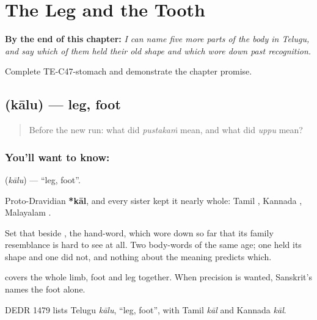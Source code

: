 
\chapter{The Leg and the Tooth}
\label{ch:te-body-more}

\begin{chapteropening}
\textbf{By the end of this chapter:} \emph{I can name five more parts of the body in Telugu, and say which of them held their old shape and which wore down past recognition.}

Complete TE-C47-stomach and demonstrate the chapter promise.
\end{chapteropening}

\section[\texorpdfstring{\te{కాలు} (kālu)}{కాలు (kālu)}]{ (kālu) — leg, foot}

\label{lesson:TE-C47-leg}



\begin{quote}
Before the new run: what did \emph{pustakaṁ} mean, and what did \emph{uppu} mean?
\end{quote}

\subsection*{You'll want to know: }
\textbf{} (\emph{kālu}) — \textquotedblleft{}leg, foot\textquotedblright{}.

Proto-Dravidian \textbf{*kāl}, and every sister kept it nearly whole: Tamil , Kannada , Malayalam .

Set that beside , the hand-word, which wore down so far that its family resemblance is hard to see at all. Two body-words of the same age; one held its shape and one did not, and nothing about the meaning predicts which.

 covers the whole limb, foot and leg together. When precision is wanted, Sanskrit's  names the foot alone.

DEDR 1479 lists Telugu \emph{kālu}, \textquotedblleft{}leg, foot\textquotedblright{}, with Tamil \emph{kāl} and Kannada \emph{kāl}.


